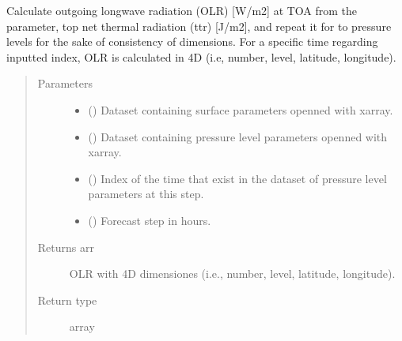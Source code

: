 \documentclass[a4paper,11pt,english]{sphinxmanual}
\begin{document}

\begin{fulllineitems}
\label{\detokenize{envlib:envlib.processing_surf_vars.extend_olr_pl_5d}}
\sphinxAtStartPar
Calculate outgoing longwave radiation (OLR) {[}W/m2{]} at TOA from the parameter, top net thermal radiation (ttr)
{[}J/m2{]}, and repeat it for to pressure levels for the sake of consistency of dimensions. For a specific time
regarding inputted index, OLR is calculated in 4D (i.e, number, level, latitude, longitude).
\begin{quote}\begin{description}
\item[{Parameters}] \leavevmode\begin{itemize}
\item {} 
\sphinxAtStartPar
{} () \textendash{} Dataset containing surface parameters openned with xarray.

\item {} 
\sphinxAtStartPar
{} () \textendash{} Dataset containing pressure level parameters openned with xarray.

\item {} 
\sphinxAtStartPar
{} () \textendash{} Index of the time that exist in the dataset of pressure level parameters at this step.

\item {} 
\sphinxAtStartPar
{} () \textendash{} Forecast step in hours.

\end{itemize}

\item[{Returns arr}] \leavevmode
\sphinxAtStartPar
OLR with 4D dimensiones (i.e., number, level, latitude, longitude).

\item[{Return type}] \leavevmode
\sphinxAtStartPar
array

\end{description}\end{quote}

\end{fulllineitems}
\end{document}

